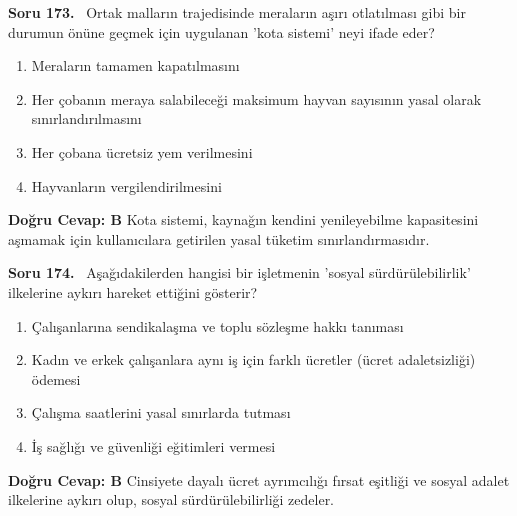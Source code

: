\documentclass[11pt,a4paper,openany]{book}
\begin{document}
\needspace{5cm}
\vspace{8pt}
\noindent\textbf{\large\sffamily Soru 173.} \ Ortak malların trajedisinde meraların aşırı otlatılması gibi bir durumun önüne geçmek için uygulanan 'kota sistemi' neyi ifade eder?
\begin{enumerate}[label=\Alph*), leftmargin=25pt, topsep=4pt, itemsep=2pt]
    \item Meraların tamamen kapatılmasını
    \item Her çobanın meraya salabileceği maksimum hayvan sayısının yasal olarak sınırlandırılmasını
    \item Her çobana ücretsiz yem verilmesini
    \item Hayvanların vergilendirilmesini
\end{enumerate}
\vspace{4pt}
\begin{tcolorbox}[title=Cevap ve Açıklama, colback=gray!3!white, colframe=primarycolor!90!black, arc=2mm, fonttitle=\bfseries\sffamily, top=6pt, bottom=6pt]
    \textbf{Doğru Cevap: B}
    \vspace{2pt}
    Kota sistemi, kaynağın kendini yenileyebilme kapasitesini aşmamak için kullanıcılara getirilen yasal tüketim sınırlandırmasıdır.
\end{tcolorbox}
\vspace{10pt}

\needspace{5cm}
\vspace{8pt}
\noindent\textbf{\large\sffamily Soru 174.} \ Aşağıdakilerden hangisi bir işletmenin 'sosyal sürdürülebilirlik' ilkelerine aykırı hareket ettiğini gösterir?
\begin{enumerate}[label=\Alph*), leftmargin=25pt, topsep=4pt, itemsep=2pt]
    \item Çalışanlarına sendikalaşma ve toplu sözleşme hakkı tanıması
    \item Kadın ve erkek çalışanlara aynı iş için farklı ücretler (ücret adaletsizliği) ödemesi
    \item Çalışma saatlerini yasal sınırlarda tutması
    \item İş sağlığı ve güvenliği eğitimleri vermesi
\end{enumerate}
\vspace{4pt}
\begin{tcolorbox}[title=Cevap ve Açıklama, colback=gray!3!white, colframe=primarycolor!90!black, arc=2mm, fonttitle=\bfseries\sffamily, top=6pt, bottom=6pt]
    \textbf{Doğru Cevap: B}
    \vspace{2pt}
    Cinsiyete dayalı ücret ayrımcılığı fırsat eşitliği ve sosyal adalet ilkelerine aykırı olup, sosyal sürdürülebilirliği zedeler.
\end{tcolorbox}
\vspace{10pt}
\end{document}
